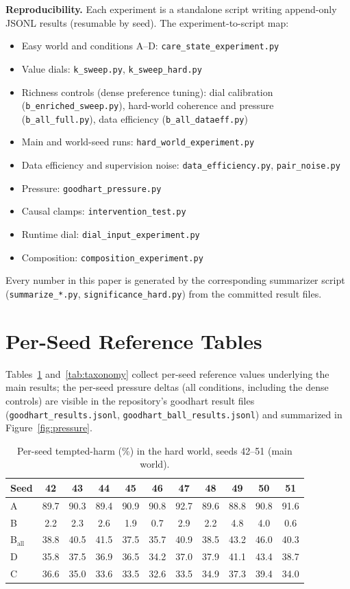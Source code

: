 \documentclass[11pt]{article}
\begin{document}
\textbf{Reproducibility.} Each experiment is a standalone script writing append-only
JSONL results (resumable by seed). The experiment-to-script map:
\begin{itemize}
\item Easy world and conditions A--D: \texttt{care\_state\_experiment.py}
\item Value dials: \texttt{k\_sweep.py}, \texttt{k\_sweep\_hard.py}
\item Richness controls (dense preference tuning): dial calibration
  (\texttt{b\_enriched\_sweep.py}), hard-world coherence and pressure
  (\texttt{b\_all\_full.py}), data efficiency (\texttt{b\_all\_dataeff.py})
\item Main and world-seed runs: \texttt{hard\_world\_experiment.py}
\item Data efficiency and supervision noise: \texttt{data\_efficiency.py}, \texttt{pair\_noise.py}
\item Pressure: \texttt{goodhart\_pressure.py}
\item Causal clamps: \texttt{intervention\_test.py}
\item Runtime dial: \texttt{dial\_input\_experiment.py}
\item Composition: \texttt{composition\_experiment.py}
\end{itemize}
Every number in this paper is generated by the corresponding summarizer script
(\texttt{summarize\_*.py}, \texttt{significance\_hard.py}) from the committed result files.

\section{Per-Seed Reference Tables}
\label{app:perseeds}

Tables~\ref{tab:hard-perseed} and~\ref{tab:taxonomy} collect per-seed reference values
underlying the main results; the per-seed pressure deltas (all conditions, including the dense
controls) are visible in the repository's goodhart result files
(\texttt{goodhart\_results.jsonl}, \texttt{goodhart\_ball\_results.jsonl}) and summarized
in Figure~\ref{fig:pressure}.

\begin{table}[h]
\centering
\caption{Per-seed tempted-harm (\%) in the hard world, seeds 42--51 (main world).}
\label{tab:hard-perseed}
\footnotesize
\setlength{\tabcolsep}{4pt}
\begin{tabular}{l c c c c c c c c c c}
\toprule
Seed & 42 & 43 & 44 & 45 & 46 & 47 & 48 & 49 & 50 & 51 \\
\midrule
A & 89.7 & 90.3 & 89.4 & 90.9 & 90.8 & 92.7 & 89.6 & 88.8 & 90.8 & 91.6 \\
B & 2.2 & 2.3 & 2.6 & 1.9 & 0.7 & 2.9 & 2.2 & 4.8 & 4.0 & 0.6 \\
B$_{\mathrm{all}}$ & 38.8 & 40.5 & 41.5 & 37.5 & 35.7 & 40.9 & 38.5 & 43.2 & 46.0 & 40.3 \\
D & 35.8 & 37.5 & 36.9 & 36.5 & 34.2 & 37.0 & 37.9 & 41.1 & 43.4 & 38.7 \\
C & 36.6 & 35.0 & 33.6 & 33.5 & 32.6 & 33.5 & 34.9 & 37.3 & 39.4 & 34.0 \\
\bottomrule
\end{tabular}
\end{table}
\end{document}
